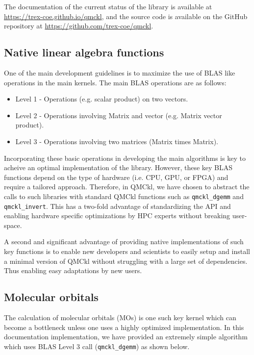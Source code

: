 The documentation of the current status of the library is available
at \url{https://trex-coe.github.io/qmckl}, and the source code is
available on the GitHub repository at \url{https://github.com/trex-coe/qmckl}.

\subsection{Native linear algebra functions}

One of the main development guidelines is to maximize the use
of \ac{BLAS} like operations in the main kernels. The main \ac{BLAS} operations are
as follows:

\begin{itemize}
\item Level 1 - Operations (e.g. scalar product) on two vectors.
\item Level 2 - Operations involving Matrix and vector (e.g. Matrix vector product).
\item Level 3 - Operations involving two matrices (Matrix times Matrix).
\end{itemize}

Incorporating these basic operations in developing the main algorithms is key to
acheive an optimal implementation of the library. However, these key BLAS
functions depend on the type of hardware (i.e. CPU, GPU, or FPGA) and require a
tailored approach. Therefore, in \ac{QMCkl}, we have chosen to abstract the
calls to such libraries with standard \ac{QMCkl} functions such as
\texttt{qmckl_dgemm} and \texttt{qmckl_invert}. This has a
two-fold advantage of standardizing the API and enabling hardware specific
optimizations by HPC experts without breaking user-space.

A second and significant advantage of providing native implementations of
such key functions is to enable new developers and scientists to easily
setup and install a minimal version of \ac{QMCkl} without struggling with
a large set of dependencies. Thus enabling easy adaptations by new users.

\subsection{Molecular orbitals}

The calculation of molecular orbitals (MOs) is one such key kernel which can
become a bottleneck unless one uses a highly optimized implementation.
In this documentation implementation, we have provided an extremely simple
algorithm which uses \ac{BLAS} Level 3 call (\texttt{qmckl_dgemm})
as shown below.

